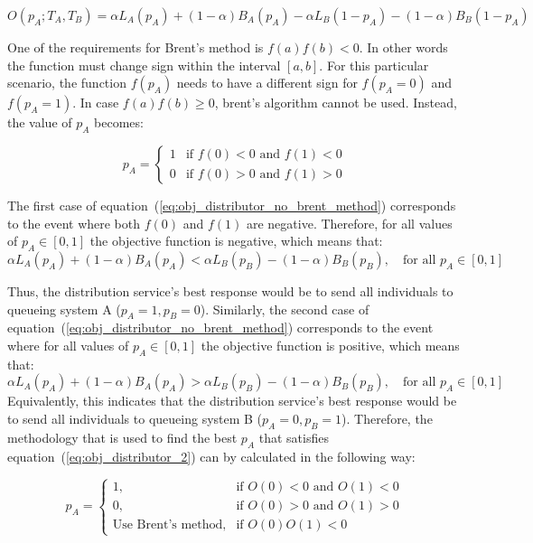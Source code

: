 \begin{equation*}
    O(p_A; T_A, T_B) = \alpha L_A(p_A) + (1 - \alpha) B_A(p_A) -
    \alpha L_B(1 - p_A) - (1 - \alpha)B_B(1 - p_A)
\end{equation*}

One of the requirements for Brent's method is \(f(a)f(b) < 0\).
In other words the function must change sign within the interval \([a, b]\).
For this particular scenario, the function \(f(p_A)\) needs to have a different
sign for \(f(p_A = 0)\) and \(f(p_A = 1)\).
In case \(f(a)f(b) \geq 0\), brent's algorithm cannot be used.
Instead, the value of \(p_A\) becomes:

\begin{equation}\label{eq:obj_distributor_no_brent_method}
    p_A = \begin{cases}
        1 & \text{if } f(0) < 0 \text{ and } f(1) < 0 \\
        0 & \text{if } f(0) > 0 \text{ and } f(1) > 0
    \end{cases}
\end{equation}

The first case of equation~(\ref{eq:obj_distributor_no_brent_method})
corresponds to the event where both \(f(0)\) and \(f(1)\) are negative.
Therefore, for all values of \(p_A \in [0, 1]\) the objective function is
negative, which means that:
\[
    \alpha L_A(p_A) + (1 - \alpha) B_A(p_A) <
    \alpha L_B(p_B) - (1 - \alpha) B_B(p_B), \quad \text{for all } p_A \in [0,1]
\]

Thus, the distribution service's best response would be to send all individuals
to queueing system A (\(p_A=1, p_B=0\)).
Similarly, the second case of
equation~(\ref{eq:obj_distributor_no_brent_method}) corresponds to the event
where for all values of \(p_A \in [0, 1]\) the objective function is
positive, which means that:
\[
    \alpha L_A(p_A) + (1 - \alpha) B_A(p_A) >
    \alpha L_B(p_B) - (1 - \alpha) B_B(p_B), \quad \text{for all } p_A \in [0,1]
\]
Equivalently, this indicates that the distribution service's best response
would be to send all individuals to queueing system B (\(p_A=0, p_B=1\)).
Therefore, the methodology that is used to find the best \(p_A\) that satisfies
equation~(\ref{eq:obj_distributor_2}) can by calculated in the following way:

\begin{equation}\label{eq:obj_distributor_implementation}
    p_A = \begin{cases}
        1, & \text{if } O(0) < 0 \text{ and } O(1) < 0 \\
        0, & \text{if } O(0) > 0 \text{ and } O(1) > 0 \\
        \text{Use Brent's method}, & \text{if } O(0)O(1) < 0
    \end{cases}
\end{equation}

